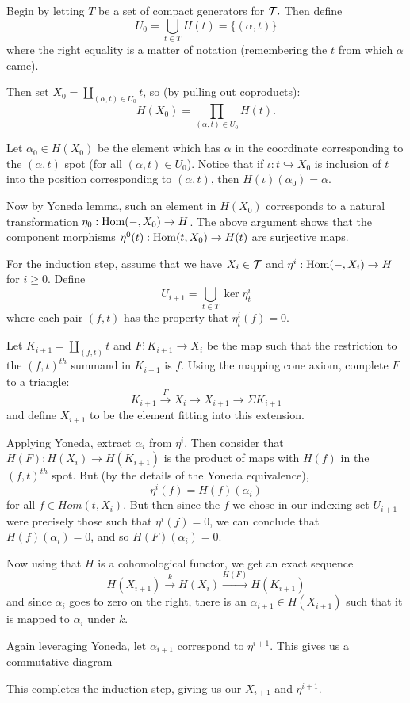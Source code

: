 \documentclass[12pt]{article}
\begin{document}
\begin{prf}
	Begin by letting $T$ be a set of compact generators for $\mathcal{T}.$ Then define 
	\[U_0=\bigcup_{t\in T}H(t)=\{(\alpha,t)\}\]
	where the right equality is a matter of notation (remembering the $t$ from which $\alpha$ came).

	Then set $X_0=\coprod_{(\alpha,t)\in U_0}t$, so (by pulling out coproducts):
	\[H(X_0)=\prod_{(\alpha,t)\in U_0}H(t).\]
	
	Let $\alpha_0\in H(X_0)$ be the element which has $\alpha$ in the coordinate corresponding to the $(\alpha,t)$ spot
	(for all $(\alpha,t)\in U_0$). Notice that if $\iota:t\hookrightarrow X_0$ is inclusion of $t$ into the position corresponding to $(\alpha,t)$,
	then $H(\iota)(\alpha_0)=\alpha.$

	Now by Yoneda lemma, such an element in $H(X_0)$ corresponds to a natural transformation $\eta_0:\operatorname{Hom}(-,X_0)\to H$. The above argument 
	shows that the component morphisms $\eta^0(t):\operatorname{Hom}(t,X_0)\to H(t)$ are surjective maps.

	\brk

	For the induction step, assume that we have $X_i\in\mathcal{T}$ and $\eta^i:\operatorname{Hom}(-,X_i)\to H$ for $i\ge 0$.
	Define 
	\[U_{i+1}=\bigcup_{t\in T}\ker\eta^i_t\]
	where each pair $(f,t)$ has the property that $\eta^i_t(f)=0.$

	Let $K_{i+1}=\coprod_{(f,t)}t$ and $F:K_{i+1}\to X_i$ be the map such that the restriction to the $(f,t)^{th}$
	summand in $K_{i+1}$ is $f$. Using the mapping cone axiom, complete $F$ to a triangle:
	\[K_{i+1}\xrightarrow{F}X_i\to X_{i+1}\to\Sigma K_{i+1}\]
	and define $X_{i+1}$ to be the element fitting into this extension.

	Applying Yoneda, extract $\alpha_i$ from $\eta^i$. Then consider that $H(F):H(X_i)\to H(K_{i+1})$ is the product of maps 
	with $H(f)$ in the $(f,t)^{th}$ spot. But (by the details of the Yoneda equivalence),
	\[\eta^i(f)=H(f)(\alpha_i)\]
	for all $f\in Hom(t,X_i)$. But then since the $f$ we chose in our indexing set $U_{i+1}$ were precisely 
	those such that $\eta^i(f)=0$, we can conclude that $H(f)(\alpha_i)=0$, and so $H(F)(\alpha_i)=0$.

	Now using that $H$ is a cohomological functor, we get an exact sequence 
	\[H(X_{i+1})\xrightarrow{k} H(X_i)\xrightarrow{H(F)} H(K_{i+1})\]
	and since $\alpha_i$ goes to zero on the right, there is an $\alpha_{i+1}\in H(X_{i+1})$ such that 
	it is mapped to $\alpha_i$ under $k$.

	Again leveraging Yoneda, let $\alpha_{i+1}$ correspond to $\eta^{i+1}$. This gives us a commutative diagram 
	\begin{center}
	\end{center}
	This completes the induction step, giving us our $X_{i+1}$ and $\eta^{i+1}$.


\end{prf}
\end{document}
